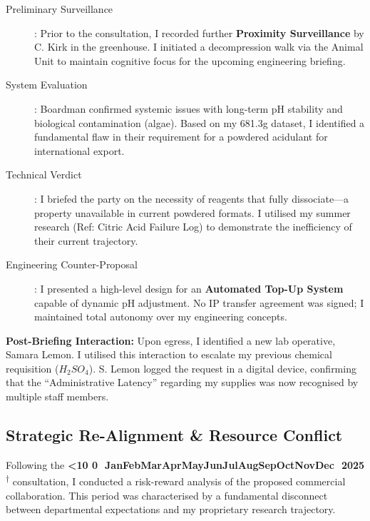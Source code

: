 \documentclass{EMBASSY}
\DeclareRobustCommand{\gmt}[3]{%
    \texorpdfstring{%
        {\color{DateGold}\textbf{%
            \ifnum#1<10 0\fi#1\,\textperiodcentered\,%
            \ifcase#2\or Jan\or Feb\or Mar\or Apr\or May\or Jun\or Jul\or Aug\or Sep\or Oct\or Nov\or Dec\fi
            \,\textperiodcentered\,20#3%
            \textsuperscript{$\dagger$}%
        }}%
    }{%
        (#1/#2/#3)%
    }%
}
\begin{document}
\begin{description}
	\item[Preliminary Surveillance]: Prior to the consultation, I recorded further \textbf{Proximity Surveillance} by C. Kirk in the greenhouse. I initiated a decompression walk via the Animal Unit to maintain cognitive focus for the upcoming engineering briefing.
	\item[System Evaluation]: Boardman confirmed systemic issues with long-term pH stability and biological contamination (algae). Based on my 681.3g dataset, I identified a fundamental flaw in their requirement for a powdered acidulant for international export.
	\item[Technical Verdict]: I briefed the party on the necessity of reagents that fully dissociate---a property unavailable in current powdered formats. I utilised my summer research (Ref: Citric Acid Failure Log) to demonstrate the inefficiency of their current trajectory.
	\item[Engineering Counter-Proposal]: I presented a high-level design for an \textbf{Automated Top-Up System} capable of dynamic pH adjustment. No IP transfer agreement was signed; I maintained total autonomy over my engineering concepts.
\end{description}

\noindent\textbf{Post-Briefing Interaction:} Upon egress, I identified a new lab operative, Samara Lemon. I utilised this interaction to escalate my previous chemical requisition ($H_{2}SO_{4}$). S. Lemon logged the request in a digital device, confirming that the ``Administrative Latency'' regarding my supplies was now recognised by multiple staff members.

\subsection{Strategic Re-Alignment \& Resource Conflict}
Following the \gmt{23}{10}{25} consultation, I conducted a risk-reward analysis of the proposed commercial collaboration. This period was characterised by a fundamental disconnect between departmental expectations and my proprietary research trajectory.
\end{document}
